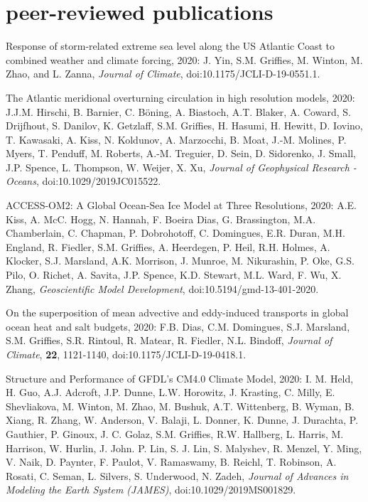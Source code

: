 \section*{\sc \color{Maroon} peer-reviewed publications}

\small 

\begin{etaremune}


\item Response of storm-related extreme sea level along the US Atlantic Coast to combined weather and climate forcing, 2020: J. Yin, S.M. Grif\/f\/ies, M. Winton, M. Zhao, and L. Zanna, {\it Journal of Climate},
doi:10.1175/JCLI-D-19-0551.1.

\item The Atlantic meridional overturning circulation in high resolution models, 2020: J.J.M. Hirschi, B. Barnier, C. {B\"{o}ning}, A. Biastoch, A.T. Blaker, A. Coward, S. Drijfhout, S. Danilov, K. Getzlaff, S.M. Grif\/f\/ies, H. Hasumi, H. Hewitt, D. Iovino, T. Kawasaki, A. Kiss, N. Koldunov, A. Marzocchi, B. Moat, J.-M. Molines, P. Myers, T. Penduff, M. Roberts, A.-M. Treguier, D. Sein, D. Sidorenko, J. Small, J.P. Spence, L. Thompson, W. Weijer, X. Xu, {\it Journal of Geophysical Research - Oceans}, doi:10.1029/2019JC015522.

\item ACCESS-OM2: A Global Ocean-Sea Ice Model at Three Resolutions, 2020: A.E. Kiss, A. McC. Hogg, N. Hannah, F. Boeira Dias, G. Brassington, M.A. Chamberlain, C. Chapman, P. Dobrohotoff, C. Domingues, E.R. Duran, M.H. England, R. Fiedler, S.M. Grif\/f\/ies,  A. Heerdegen, P. Heil, R.H. Holmes, A. Klocker, S.J. Marsland, A.K. Morrison, J. Munroe, M. Nikurashin, P. Oke, G.S. Pilo, O. Richet, A. Savita, J.P. Spence, K.D. Stewart, M.L. Ward, F. Wu, X. Zhang, {\it Geoscientific Model Development},
doi:10.5194/gmd-13-401-2020.

\item On the superposition of mean advective and eddy-induced transports in global ocean heat and salt budgets, 2020: F.B. Dias, C.M. Domingues, S.J. Marsland, S.M. Grif\/f\/ies, S.R. Rintoul, R. Matear, R. Fiedler, N.L. Bindoff, {\it Journal of Climate}, {\bf 22}, 1121-1140, doi:10.1175/JCLI-D-19-0418.1.

\item Structure and Performance of GFDL's CM4.0 Climate Model, 2020: I. M. Held, H. Guo, A.J. Adcroft, J.P. Dunne, L.W. Horowitz, J. Krasting, C. Milly, E. Shevliakova, M. Winton, M. Zhao, M. Bushuk, A.T. Wittenberg, B. Wyman, B. Xiang, R. Zhang, W. Anderson, V. Balaji, L. Donner, K. Dunne, J. Durachta, P. Gauthier, P. Ginoux, J. C. Golaz, S.M. Griffies, R.W. Hallberg, L.  Harris, M. Harrison, W. Hurlin, J. John. P. Lin, S. J. Lin, S. Malyshev, R. Menzel, Y. Ming, V. Naik, D. Paynter, F. Paulot, V. Ramaswamy, B. Reichl, T. Robinson, A. Rosati, C. Seman, L. Silvers, S. Underwood, N. Zadeh, {\it Journal of Advances in Modeling the Earth System (JAMES)}, doi:10.1029/2019MS001829.


\end{etaremune}
